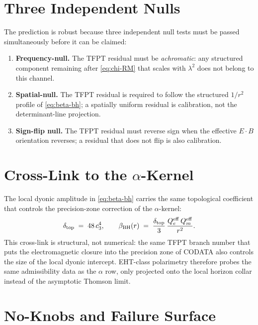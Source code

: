 \documentclass[11pt,a4paper]{article}
\begin{document}
\section{Three Independent Nulls}

The prediction is robust because three independent null tests must be passed simultaneously
before it can be claimed:

\begin{enumerate}[leftmargin=1.5em]
    \item \textbf{Frequency-null.} The TFPT residual must be \emph{achromatic}: any structured
    component remaining after \eqref{eq:chi-RM} that scales with $\lambda^2$ does not belong to
    this channel.
    \item \textbf{Spatial-null.} The TFPT residual is required to follow the structured $1/r^2$
    profile of \eqref{eq:beta-bh}; a spatially uniform residual is calibration, not the
    determinant-line projection.
    \item \textbf{Sign-flip null.} The TFPT residual must reverse sign when the effective
    $E\!\cdot\!B$ orientation reverses; a residual that does not flip is also calibration.
\end{enumerate}


\section{\texorpdfstring{Cross-Link to the $\alpha$-Kernel}{Cross-Link to the alpha-Kernel}}

The local dyonic amplitude in \eqref{eq:beta-bh} carries the same topological coefficient that
controls the precision-zone correction of the $\alpha$-kernel:
\[
\delta_{\mathrm{top}}\;=\;48\,c_3^4,
\qquad
\beta_{\mathrm{BH}}(r)\;=\;\frac{\delta_{\mathrm{top}}}{3}\,\frac{Q_e^{\mathrm{eff}}\,Q_m^{\mathrm{eff}}}{r^2}.
\]
This cross-link is structural, not numerical: the same TFPT branch number that puts the
electromagnetic closure into the precision zone of CODATA also controls the size of the local
dyonic intercept. EHT-class polarimetry therefore probes the same admissibility data as the
$\alpha$ row, only projected onto the local horizon collar instead of the asymptotic Thomson
limit.


\section{No-Knobs and Failure Surface}
\end{document}

